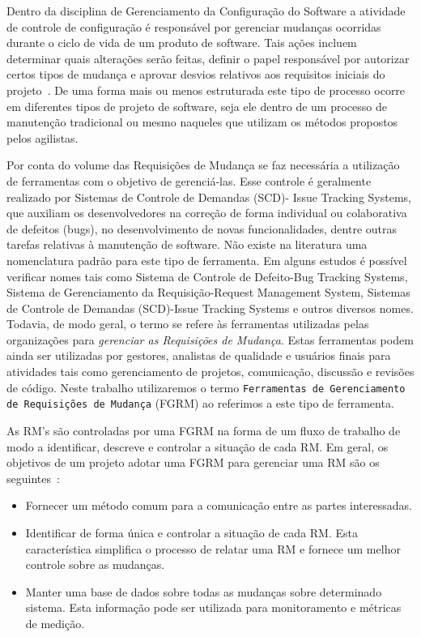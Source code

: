 Dentro da disciplina de Gerenciamento da Configuração do Software a atividade de
controle de configuração é responsável por gerenciar mudanças ocorridas durante
o ciclo de vida de um produto de software. Tais ações incluem determinar quais
alterações serão feitas, definir o papel responsável por autorizar certos tipos
de mudança e aprovar desvios relativos aos requisitos iniciais do
projeto~\cite{4425813}. De uma forma mais ou menos estruturada este tipo de
processo ocorre em diferentes tipos de projeto de software, seja ele dentro de
um processo de manutenção tradicional ou mesmo naqueles que utilizam os métodos
propostos pelos agilistas.

Por conta do volume das Requisições de Mudança se faz necessária a utilização de
ferramentas com o objetivo de gerenciá-las. Esse controle é geralmente realizado
por Sistemas de Controle de Demandas (SCD)- Issue Tracking Systems, que auxiliam
os desenvolvedores na correção de forma individual ou colaborativa de defeitos
(bugs), no desenvolvimento de novas funcionalidades, dentre outras tarefas
relativas à manutenção de software. Não existe na literatura uma nomenclatura
padrão para este tipo de ferramenta. Em alguns estudos é possível verificar
nomes tais como Sistema de Controle de Defeito\@-\@ Bug Tracking Systems,
Sistema de Gerenciamento da Requisição\@-\@ Request Management System, Sistemas
de Controle de Demandas (SCD)\@-\@ Issue Tracking Systems e outros diversos
nomes.  Todavia, de modo geral, o termo se refere às ferramentas utilizadas
pelas organizações para \textit{gerenciar as Requisições de Mudança}. Estas
ferramentas podem ainda ser utilizadas por gestores, analistas de qualidade e
usuários finais para atividades tais como gerenciamento de projetos,
comunicação, discussão e revisões de código. Neste trabalho utilizaremos o termo
\texttt{Ferramentas de Gerenciamento de Requisições de Mudança} (FGRM) ao
referimos a este tipo de ferramenta.

As RM's são controladas por uma FGRM na forma de um fluxo de trabalho de modo a
identificar, descreve e controlar a situação de cada RM. Em geral, os objetivos
de um projeto adotar uma FGRM para gerenciar uma RM são os
seguintes~\cite{tripathy2014software}:

\begin{itemize}
	\item Fornecer um método comum para a comunicação entre as partes
		interessadas.
	\item Identificar de forma única e controlar a situação de cada RM. Esta
		característica simplifica o processo de relatar uma RM e fornece um
		melhor controle sobre as mudanças.
	\item Manter uma base de dados sobre todas as mudanças sobre determinado
		sistema. Esta informação pode ser utilizada para monitoramento e
		métricas de medição.
\end{itemize}

